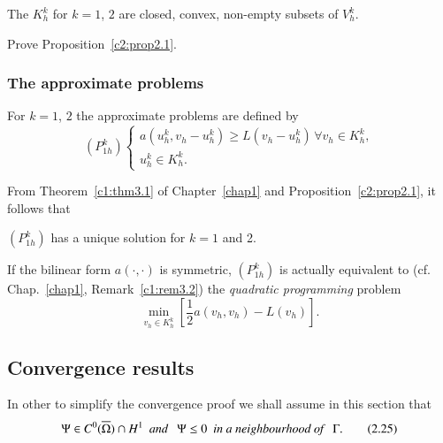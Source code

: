 \begin{proposition}\label{c2:prop2.1}%
The $K^k_h$ for $k=1$, $2$ are closed, convex, non-empty subsets of $V^k_h$.
\end{proposition}

\begin{exercise}\label{c2:exer2.2}%
Prove Proposition~\ref{c2:prop2.1}.
\end{exercise}

\subsubsection{The approximate problems }%

For $k=1$, $2$ the approximate problems are defined by 
$$
(P^k_{1h})
\begin{cases}
a(u^k_h, v_h - u^k_h) \geq L (v_h - u^k_h)\, \forall v_h \in K^k_h,\\
u^k_h \in K^k_h.
\end{cases}
$$

From Theorem~\ref{c1:thm3.1} of Chapter~\ref{chap1} and 
Proposition~\ref{c2:prop2.1}, it follows that 

\begin{proposition}\label{c2:prop2.2}%
$(P^k_{1h})$ has a unique solution for $k = 1$ and 2.
\end{proposition}

\begin{remark}\label{c2:rem2.3}%
If the bilinear form $a(\cdot ,\cdot)$ is symmetric, $(P^k_{1h})$ is
actually 
equivalent to (cf. Chap.~\ref{chap1}, Remark~\ref{c1:rem3.2}) the 
{\em quadratic programming} problem 
\begin{equation}
\min\limits_{v_h \in K^k_h} \left[ \frac{1}{2} a (v_h, v_h)-  L
  (v_h)\right]. \tag{2.24}\label{c2:eq2.24} 
\end{equation}

\subsection{Convergence results}\label{c2:ss2.6}%

In other to simplify the convergence proof we shall assume in this
section that  
\begin{equation}
\Psi \in C^0 (\overline{\Omega}) \cap H^1 ~~\text{\em and }~~
\Psi \leq 0~~ \text{\em in a neighbourhood of
}~~\Gamma.\tag{2.25}\label{c2:eq2.25}  
\end{equation}
\end{remark}

